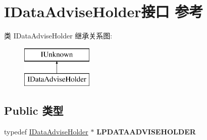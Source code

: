 \hypertarget{interface_i_data_advise_holder}{}\section{I\+Data\+Advise\+Holder接口 参考}
\label{interface_i_data_advise_holder}
类 I\+Data\+Advise\+Holder 继承关系图\+:\begin{figure}[H]
\begin{center}
\leavevmode
\includegraphics[height=2.000000cm]{interface_i_data_advise_holder}
\end{center}
\end{figure}
\subsection*{Public 类型}
\begin{DoxyCompactItemize}
\item 
\mbox{\label{interface_i_data_advise_holder_a5049cad38eaf91121acafdf2c17c4db0}} 
typedef \hyperlink{interface_i_data_advise_holder}{I\+Data\+Advise\+Holder} $\ast$ {\bfseries L\+P\+D\+A\+T\+A\+A\+D\+V\+I\+S\+E\+H\+O\+L\+D\+ER}
\end{DoxyCompactItemize}
